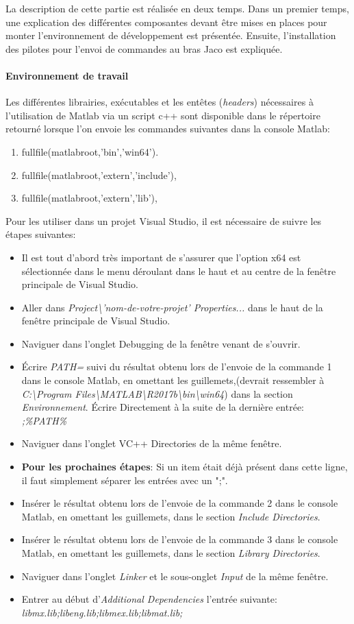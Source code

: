 \documentclass[root.tex]{subfiles}
\begin{document}
La description de cette partie est réalisée en deux temps.
Dans un premier temps, une explication des différentes composantes devant être mises en places pour monter l'environnement de développement est présentée.
Ensuite, l'installation des pilotes pour l'envoi de commandes au bras Jaco est expliquée.
\paragraph{Environnement de travail} Les différentes librairies, exécutables et les entêtes (\textit{headers})  nécessaires à l'utilisation de Matlab via un script c++ sont disponible dans le répertoire retourné lorsque l'on envoie les commandes suivantes dans la console Matlab:
\begin{enumerate}
\item fullfile(matlabroot,'bin','win64').
\item fullfile(matlabroot,'extern','include'),
\item fullfile(matlabroot,'extern','lib'),
\end{enumerate}

Pour les utiliser dans un projet Visual Studio, il est nécessaire de suivre les étapes suivantes:
\begin{itemize}
\item Il est tout d'abord très important de s'assurer que l'option x64 est sélectionnée dans le menu déroulant dans le haut et au centre de la fenêtre principale de Visual Studio.
\item Aller dans \textit{Project\textbackslash'nom-de-votre-projet' Properties...} dans le haut de la fenêtre principale de Visual Studio.
\item Naviguer dans l'onglet Debugging de la fenêtre venant de s'ouvrir.
\item Écrire \textit{PATH=} suivi du résultat obtenu lors de l'envoie de la commande 1 dans le console Matlab, en omettant les guillemets,(devrait ressembler à \newline \textit{C:\textbackslash Program Files\textbackslash MATLAB\textbackslash R2017b\textbackslash bin\textbackslash win64}) dans la section \textit{Environnement}.
Écrire Directement à la suite de la dernière entrée: \textit{;\%PATH\%}
\item Naviguer dans l'onglet VC++ Directories de la même fenêtre.
\item \textbf{Pour les prochaines étapes}: Si un item était déjà présent dans cette ligne, il faut simplement séparer les entrées avec un ";".
\item Insérer le résultat obtenu lors de l'envoie de la commande 2 dans le console Matlab, en omettant les guillemets, dans le section \textit{Include Directories}.
\item Insérer le résultat obtenu lors de l'envoie de la commande 3 dans le console Matlab, en omettant les guillemets, dans le section \textit{Library Directories}.
\item Naviguer dans l'onglet \textit{Linker} et le sous-onglet \textit{Input} de la même fenêtre.
\item Entrer au début d'\textit{Additional Dependencies} l'entrée suivante: \textit{libmx.lib;libeng.lib;libmex.lib;libmat.lib;}
\end{itemize}
\end{document}
